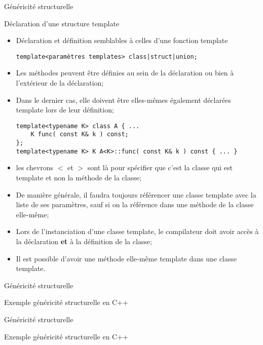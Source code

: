 \documentclass[handout,10pt]{beamer}
\newcommand{\includepartcode}[4][cpp]{

}
\begin{document}
\begin{frame}[fragile]{Généricité structurelle}
\scriptsize
\begin{block}{Déclaration d'une structure template}
\begin{itemize}
\item Déclaration et définition semblables à celles d'une fonction template
\begin{lstlisting}
template<paramètres templates> class|struct|union; 
\end{lstlisting}
\item Les méthodes peuvent être définies au sein de la déclaration ou bien à l'extérieur de la déclaration;
\item Dans le dernier cas, elle doivent être elles-mêmes également déclarées template lors de leur définition;
\begin{lstlisting}
template<typename K> class A { ...
    K func( const K& k ) const;
};
template<typename K> K A<K>::func( const K& k ) const { ... }
\end{lstlisting}
\item les chevrons $<$ et $>$ sont là pour spécifier que c'est la classe qui est template et non la méthode de la classe;
\item De manière générale, il faudra toujours référencer une classe template avec la liste de ses paramètres, sauf si on la référence dans une méthode de la classe elle-même;
\item Lors de l'instanciation d'une classe template, le compilateur doit avoir accès à la déclaration \textbf{et} à la définition de la classe;
\item Il est possible d'avoir une méthode elle-même template dans une classe template.
\end{itemize}
\end{block}
\end{frame}

\begin{frame}[fragile]{Généricité structurelle}
\tiny
\begin{exampleblock}{Exemple généricité structurelle en C++}
\includepartcode{template_struct.cpp}{4}{28}
\end{exampleblock}
\end{frame}

\begin{frame}[fragile]{Généricité structurelle}
\tiny
\begin{exampleblock}{Exemple généricité structurelle en C++}
\includepartcode{template_struct.cpp}{29}{52}
\end{exampleblock}
\end{frame}
\end{document}
